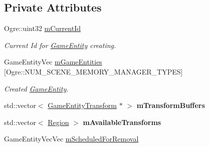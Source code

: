 \subsection*{Private Attributes}
\begin{DoxyCompactItemize}
\item 
\mbox{\label{class_common_1_1_game_entity_manager_a45f10e0964dc22d3db811ff28dc6da55}} 
Ogre\+::uint32 \hyperlink{class_common_1_1_game_entity_manager_a45f10e0964dc22d3db811ff28dc6da55}{m\+Current\+Id}
\begin{DoxyCompactList}\small\item\em Current Id for \hyperlink{struct_common_1_1_game_entity}{Game\+Entity} creating. \end{DoxyCompactList}\item 
\mbox{\label{class_common_1_1_game_entity_manager_a7332d715d5c9518860fba2fb0aefc3c9}} 
Game\+Entity\+Vec \hyperlink{class_common_1_1_game_entity_manager_a7332d715d5c9518860fba2fb0aefc3c9}{m\+Game\+Entities} \mbox{[}Ogre\+::\+N\+U\+M\+\_\+\+S\+C\+E\+N\+E\+\_\+\+M\+E\+M\+O\+R\+Y\+\_\+\+M\+A\+N\+A\+G\+E\+R\+\_\+\+T\+Y\+P\+ES\mbox{]}
\begin{DoxyCompactList}\small\item\em Created \hyperlink{struct_common_1_1_game_entity}{Game\+Entity}. \end{DoxyCompactList}\item 
\mbox{\label{class_common_1_1_game_entity_manager_a991cd183485129e72a3144982ea788cf}} 
std\+::vector$<$ \hyperlink{struct_common_1_1_game_entity_transform}{Game\+Entity\+Transform} $\ast$ $>$ {\bfseries m\+Transform\+Buffers}
\item 
\mbox{\label{class_common_1_1_game_entity_manager_aa068de11d71bc5192d1b92d7d59fbb63}} 
std\+::vector$<$ \hyperlink{struct_common_1_1_game_entity_manager_1_1_region}{Region} $>$ {\bfseries m\+Available\+Transforms}
\item 
\mbox{\label{class_common_1_1_game_entity_manager_a608f0beb843d870520094ba4b46af394}} 
Game\+Entity\+Vec\+Vec \hyperlink{class_common_1_1_game_entity_manager_a608f0beb843d870520094ba4b46af394}{m\+Scheduled\+For\+Removal}

\end{DoxyCompactItemize}
